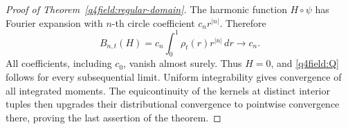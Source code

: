 \begin{proof}[Proof of Theorem~\ref{q4field:regular-domain}]
The harmonic function $H\circ\psi$ has Fourier expansion with
$n$-th circle coefficient $c_n r^{|n|}$.  Therefore
\[
 B_{n,t}(H)=c_n\int_0^1\rho_t(r)r^{|n|}\,dr
       \longrightarrow c_n.
\]
All coefficients, including $c_0$, vanish almost surely.  Thus $H=0$,
and \eqref{q4field:Q} follows for every subsequential limit.
Uniform integrability gives convergence of all integrated moments.
The equicontinuity of the kernels at distinct interior tuples then
upgrades their distributional convergence to pointwise convergence
there, proving the last assertion of the theorem.
\end{proof}
